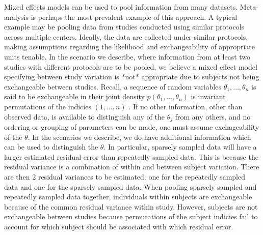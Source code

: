 Mixed effects models can be used to pool information from many datasets.  Meta-analysis is perhaps the most prevalent example of this approach.  A typical example may be pooling data from studies conducted using similar protocols across multiple centers.  Ideally, the data are collected under similar protocols, making assumptions regarding the likelihood and exchangeability of appropriate units tenable.  In the scenario we describe, where information from at least two studies with different protocols are to be pooled, we believe a mixed effect model specifying between study variation is *not* appropriate due to subjects not being exchangeable between studies.  Recall, a sequence of random variables $\theta_1, \dots, \theta_n$ is said to be exchangeable in their joint density $p(\theta_1, \dots, \theta_n)$ is invariant permutations of the indicies $(1, \dots, n)$ \cite{gelman1995bayesian}.  If no other information, other than observed data, is available to distinguish any of the $\theta_j$ from any others, and no ordering or grouping of parameters can be made, one must assume exchageability of the $\theta$.  In the scenarios we describe, we do have additional information which can be used to distinguish the $\theta$.  In particular, sparsely sampled data will have a larger estimated residual error than repeatedly sampled data.  This is because the residual variance is a combination of within and between subject variation. There are then 2 residual variances to be estimated: one for the repeatedly sampled data and one for the sparsely sampled data.  When pooling sparsely sampled and repeatedly sampled data together, individuals within subjects are exchangeable because of the common residual variance within study. However, subjects are not exchangeable between studies because permutations of the subject indicies fail to account for which subject should be associated with which residual error.